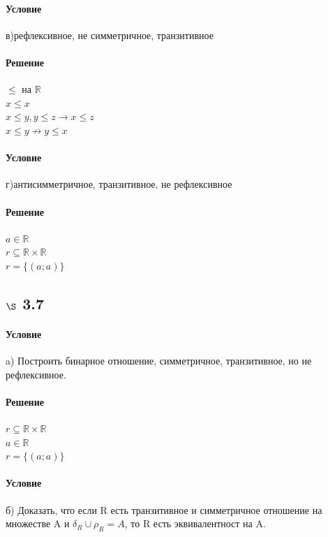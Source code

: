 \documentclass[a4paper,12pt]{article}
\begin{document}
\paragraph*{Условие}
в)рефлексивное, не симметричное, транзитивное\\
\paragraph*{Решение}
$ \leq $ на $ \mathbb{R} $ \\
$ x \leq x$ \\
$ x \leq y, y \leq z \rightarrow x \leq z$\\
$ x \leq y \nrightarrow y \leq x$\\
\paragraph*{Условие}
г)антисимметричное, транзитивное, не рефлексивное\\
\paragraph*{Решение}
$ a \in \mathbb{R} $ \\
$ r \subseteq  \mathbb{R} \times \mathbb{R}$ \\
$ r=\{ (a;a) \} $\\

\subsection*{$\S$ 3.7}
\paragraph*{Условие}
a) Построить бинарное отношение, симметричное, транзитивное, но не рефлексивное.
\paragraph*{Решение}
$r\subseteq \mathbb{R} \times \mathbb{R}$\\
$ a \in \mathbb{R}$\\
$ r =\lbrace ( a; a ) \rbrace $\\
\paragraph*{Условие}
б) Доказать, что если R есть транзитивное и симметричное отношение на множестве A и $\delta_R\cup\rho_R = A$, то R есть эквивалентност на A.
\end{document}
